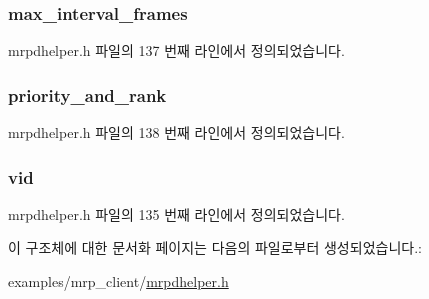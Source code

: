 \subsubsection[{\texorpdfstring{max\+\_\+interval\+\_\+frames}{max_interval_frames}}]{ max\+\_\+interval\+\_\+frames}\hypertarget{structmrpdhelper__msrp__talker_a039b8d4f5698032d8d33997781ce9ee1}{}\label{structmrpdhelper__msrp__talker_a039b8d4f5698032d8d33997781ce9ee1}


mrpdhelper.\+h 파일의 137 번째 라인에서 정의되었습니다.

\subsubsection[{\texorpdfstring{priority\+\_\+and\+\_\+rank}{priority_and_rank}}]{ priority\+\_\+and\+\_\+rank}\hypertarget{structmrpdhelper__msrp__talker_a1e87590ea941aced51cc9f8f27fd7995}{}\label{structmrpdhelper__msrp__talker_a1e87590ea941aced51cc9f8f27fd7995}


mrpdhelper.\+h 파일의 138 번째 라인에서 정의되었습니다.

\subsubsection[{\texorpdfstring{vid}{vid}}]{ vid}\hypertarget{structmrpdhelper__msrp__talker_a98780fe4ab562a61abfd7870ea0910c3}{}\label{structmrpdhelper__msrp__talker_a98780fe4ab562a61abfd7870ea0910c3}


mrpdhelper.\+h 파일의 135 번째 라인에서 정의되었습니다.



이 구조체에 대한 문서화 페이지는 다음의 파일로부터 생성되었습니다.\+:\begin{DoxyCompactItemize}
\item 
examples/mrp\+\_\+client/\hyperlink{mrpdhelper_8h}{mrpdhelper.\+h}\end{DoxyCompactItemize}
